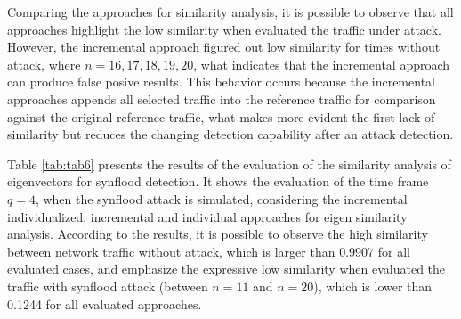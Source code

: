 Comparing the approaches for similarity analysis, it is possible to observe that all approaches highlight the low similarity when evaluated the traffic under attack. However, the incremental approach figured out low similarity for times without attack, where $n=16, 17, 18, 19, 20$, what indicates that the incremental approach can produce false posive results. This behavior occurs because the incremental approaches appends all selected traffic into the reference traffic for comparison against the original reference traffic, what makes more evident the first lack of similarity but reduces the changing detection capability after an attack detection.

Table \ref{tab:tab6} presents the results of the evaluation of the similarity analysis of eigenvectors for synflood detection. It shows the evaluation of the time frame $q=4$, when the synflood attack is simulated, considering the incremental individualized, incremental and individual approaches for eigen similarity analysis. According to the results, it is possible to observe the high similarity between network traffic without attack, which is larger than 0.9907 for all evaluated cases, and emphasize the expressive low similarity when evaluated the traffic with synflood attack (between $n=11$ and $n=20$), which is lower than 0.1244 for all evaluated approaches.

